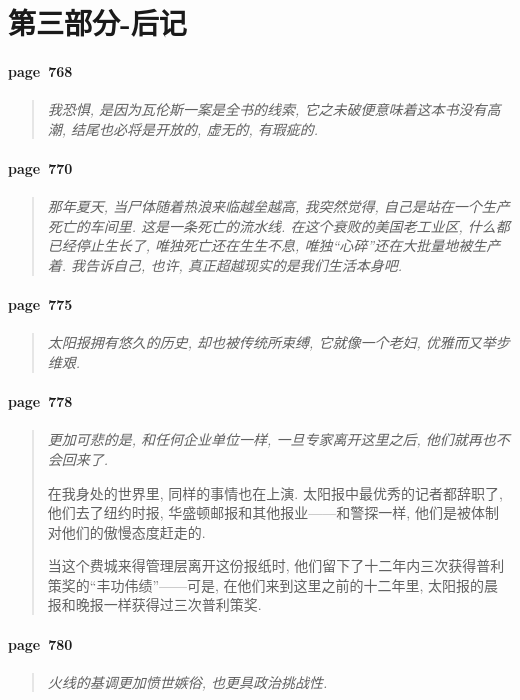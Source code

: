 \section{第三部分-后记}

\paragraph*{page~768}
\begin{quotation}
    \itshape
    我恐惧, 是因为瓦伦斯一案是全书的线索, 它之未破便意味着这本书没有高潮, 结尾也必将是开放的, 虚无的, 有瑕疵的. 
\end{quotation}

\paragraph*{page~770}
\begin{quotation}
    \itshape
    那年夏天, 当尸体随着热浪来临越垒越高, 我突然觉得, 自己是站在一个生产死亡的车间里. 这是一条死亡的流水线. 在这个衰败的美国老工业区, 什么都已经停止生长了, 唯独死亡还在生生不息, 唯独``心碎''还在大批量地被生产着. 我告诉自己, 也许, 真正超越现实的是我们生活本身吧. 
\end{quotation}

\paragraph*{page~775}
\begin{quotation}
    \itshape
    太阳报拥有悠久的历史, 却也被传统所束缚, 它就像一个老妇, 优雅而又举步维艰. 
\end{quotation}

\paragraph*{page~778}
\begin{quotation}
    \itshape
    更加可悲的是, 和任何企业单位一样, 一旦专家离开这里之后, 他们就再也不会回来了. 

    在我身处的世界里, 同样的事情也在上演. 太阳报中最优秀的记者都辞职了, 他们去了纽约时报, 华盛顿邮报和其他报业------和警探一样, 他们是被体制对他们的傲慢态度赶走的.

    当这个费城来得管理层离开这份报纸时, 他们留下了十二年内三次获得普利策奖的``丰功伟绩''------可是, 在他们来到这里之前的十二年里, 太阳报的晨报和晚报一样获得过三次普利策奖. 
\end{quotation}

\paragraph*{page~780}
\begin{quotation}
    \itshape
    火线的基调更加愤世嫉俗, 也更具政治挑战性. 
\end{quotation}

